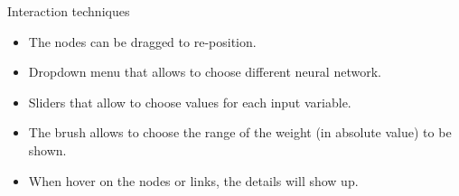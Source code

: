 \documentclass[final,hyperref={pdfpagelabels=false}]{beamer}
\begin{document}
\begin{frame}{}
\begin{columns}[t]
\begin{column}{.65\linewidth}
\begin{block}{Interaction techniques}
\begin{itemize}
\item The nodes can be dragged to re-position.
\item Dropdown menu that allows to choose different neural network.
\item Sliders that allow to choose values for each input variable.
\item The brush allows to choose the range of the weight (in absolute value) to be shown.
\item When hover on the nodes or links, the details will show up.
\end{itemize}
\end{block}       

      
      \end{column}

      
    \end{columns}
  \end{frame}
\end{document}
